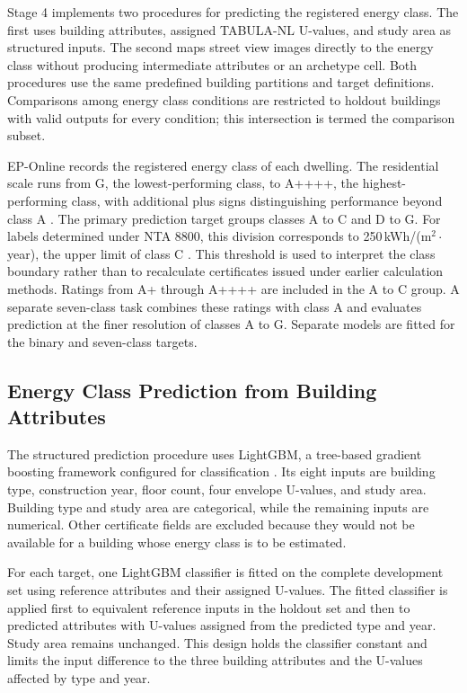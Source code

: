 Stage 4 implements two procedures for predicting the registered energy class.
The first uses building attributes, assigned TABULA-NL U-values, and study area as structured inputs.
The second maps street view images directly to the energy class without producing intermediate attributes or an archetype cell.
Both procedures use the same predefined building partitions and target definitions.
Comparisons among energy class conditions are restricted to holdout buildings with valid outputs for every condition; this intersection is termed the comparison subset.

EP-Online records the registered energy class of each dwelling.
The residential scale runs from G, the lowest-performing class, to A++++, the highest-performing class, with additional plus signs distinguishing performance beyond class A \parencite{rvoenergielabel}.
The primary prediction target groups classes A to C and D to G.
For labels determined under NTA 8800, this division corresponds to 250\,kWh/(m$^2\cdot$year), the upper limit of class C \parencite{rvoenergielabel2024}.
This threshold is used to interpret the class boundary rather than to recalculate certificates issued under earlier calculation methods.
Ratings from A+ through A++++ are included in the A to C group.
A separate seven-class task combines these ratings with class A and evaluates prediction at the finer resolution of classes A to G.
Separate models are fitted for the binary and seven-class targets.

\subsection{Energy Class Prediction from Building Attributes}
\label{sec:attribute_based_energy_class_prediction}

The structured prediction procedure uses \acf{LightGBM}, a tree-based gradient boosting framework configured for classification \parencite{ke2017}.
Its eight inputs are building type, construction year, floor count, four envelope U-values, and study area.
Building type and study area are categorical, while the remaining inputs are numerical.
Other certificate fields are excluded because they would not be available for a building whose energy class is to be estimated.

For each target, one \acs{LightGBM} classifier is fitted on the complete development set using reference attributes and their assigned U-values.
The fitted classifier is applied first to equivalent reference inputs in the holdout set and then to predicted attributes with U-values assigned from the predicted type and year.
Study area remains unchanged.
This design holds the classifier constant and limits the input difference to the three building attributes and the U-values affected by type and year.

